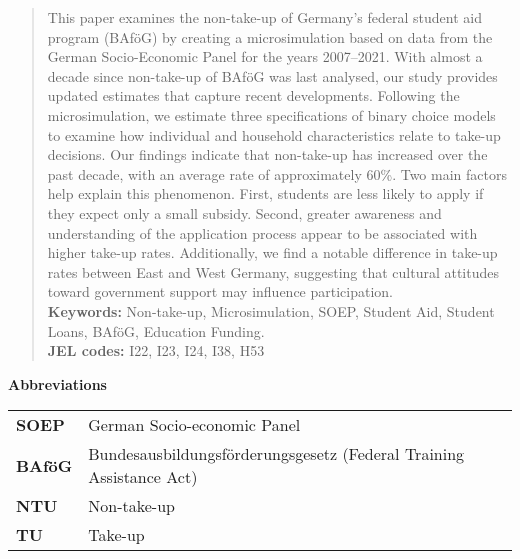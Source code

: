 \documentclass[12pt, a4paper]{article}
\date{Seminar date}
\begin{document}


\newpage
\begin{abstract}
\noindent This paper examines the non-take-up of Germany’s federal student aid program (BAföG) by creating a microsimulation based on data from the German Socio-Economic Panel for the years 2007--2021. 
With almost a decade since non-take-up of BAföG was last analysed, our study provides updated estimates that capture recent developments. 
Following the microsimulation, we estimate three specifications of binary choice models to examine how individual and household characteristics relate to take-up decisions. 
Our findings indicate that non-take-up has increased over the past decade, with an average rate of approximately 60\%. 
Two main factors help explain this phenomenon. 
First, students are less likely to apply if they expect only a small subsidy. 
Second, greater awareness and understanding of the application process appear to be associated with higher take-up rates. Additionally, we find a notable difference in take-up rates between East and West Germany, suggesting that cultural attitudes toward government support may influence participation.
\vspace{1cm} \\
    \noindent \textbf{Keywords:} Non-take-up, 
    Microsimulation, 
    SOEP, 
    Student Aid, 
    Student Loans, 
    BAföG, 
    Education Funding. \\
    \noindent \textbf{JEL codes:} I22, I23, I24, I38, H53
\end{abstract}

\vspace{1cm}

\begin{center}
    \textbf{Abbreviations}
\end{center}
\begin{table}[H]
    \small
    \centering
    \begin{tabular}{ll}
        \textbf{SOEP}  & German Socio-economic Panel \\
        \textbf{BAföG}  & Bundesausbildungsförderungsgesetz (Federal Training Assistance Act) \\
        \textbf{NTU}  & Non-take-up \\
        \textbf{TU}  & Take-up \\
    \end{tabular}
\end{table}
\end{document}
